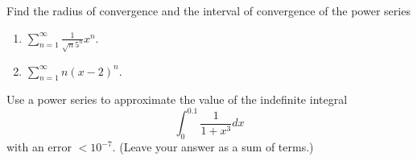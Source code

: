 \begin{problem}
Find the radius of convergence and the interval of convergence of the power
series
\begin{enumerate}[label=(\alph*)]
\item $\displaystyle\sum_{n=1}^\infty\frac{1}{\sqrt{n}5^n}x^n$.
\item $\displaystyle\sum_{n=1}^\infty n(x-2)^n$.
\end{enumerate}
\end{problem}

\bigskip

\begin{problem}
Use  a power series to approximate the value of the indefinite integral
\[
\int_0^{0.1}\frac{1}{1+x^3}dx
\]
with an error $<10^{-7}$. (Leave your answer as a sum of terms.)
\end{problem}

